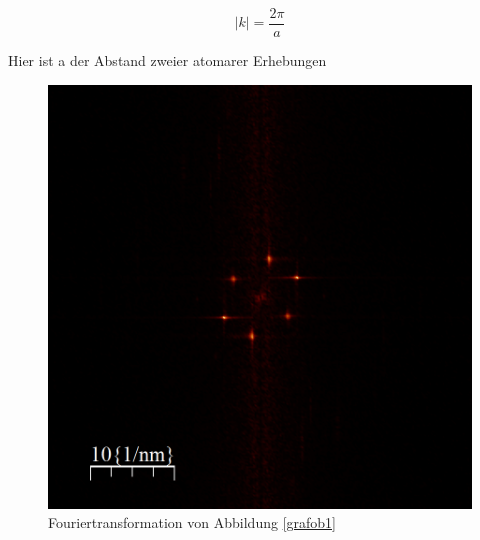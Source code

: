 \documentclass[10pt,a4paper]{article}
\begin{document}
\begin{equation}
	|k| = \frac{2\pi}{a}
\end{equation}

Hier ist a der Abstand zweier atomarer Erhebungen

\begin{figure}[h]
	\centering
	
	\includegraphics[scale = 0.5]{Fouriertrasformation_kristall.png}
	
	\caption{Fouriertransformation von Abbildung \ref{grafob1}}
	\label{fouriertansformation_ebene}
\end{figure}
\end{document}
